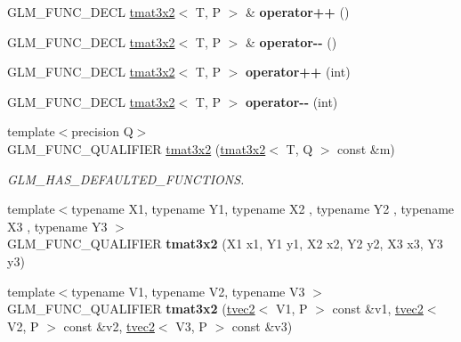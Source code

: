 \begin{DoxyCompactItemize}
G\+L\+M\+\_\+\+F\+U\+N\+C\+\_\+\+D\+E\+CL \hyperlink{structglm_1_1tmat3x2}{tmat3x2}$<$ T, P $>$ \& {\bfseries operator++} ()
\item 
\mbox{\label{structglm_1_1tmat3x2_a655f4f20c013de86c872da9a60183b05}} 
G\+L\+M\+\_\+\+F\+U\+N\+C\+\_\+\+D\+E\+CL \hyperlink{structglm_1_1tmat3x2}{tmat3x2}$<$ T, P $>$ \& {\bfseries operator-\/-\/} ()
\item 
\mbox{\label{structglm_1_1tmat3x2_a70f90e05d9c13d7145369d4e3ebf7184}} 
G\+L\+M\+\_\+\+F\+U\+N\+C\+\_\+\+D\+E\+CL \hyperlink{structglm_1_1tmat3x2}{tmat3x2}$<$ T, P $>$ {\bfseries operator++} (int)
\item 
\mbox{\label{structglm_1_1tmat3x2_a79b323eca5c708e456e2675586895444}} 
G\+L\+M\+\_\+\+F\+U\+N\+C\+\_\+\+D\+E\+CL \hyperlink{structglm_1_1tmat3x2}{tmat3x2}$<$ T, P $>$ {\bfseries operator-\/-\/} (int)
\item 
\mbox{\label{structglm_1_1tmat3x2_a5c9661d554c44cfa3db4ca95c5fd553a}} 
{\footnotesize template$<$precision Q$>$ }\\G\+L\+M\+\_\+\+F\+U\+N\+C\+\_\+\+Q\+U\+A\+L\+I\+F\+I\+ER \hyperlink{structglm_1_1tmat3x2_a5c9661d554c44cfa3db4ca95c5fd553a}{tmat3x2} (\hyperlink{structglm_1_1tmat3x2}{tmat3x2}$<$ T, Q $>$ const \&m)
\begin{DoxyCompactList}\small\item\em G\+L\+M\+\_\+\+H\+A\+S\+\_\+\+D\+E\+F\+A\+U\+L\+T\+E\+D\+\_\+\+F\+U\+N\+C\+T\+I\+O\+NS. \end{DoxyCompactList}\item 
\mbox{\label{structglm_1_1tmat3x2_a52d0621ae05376523e889c01e6ad3e08}} 
{\footnotesize template$<$typename X1, typename Y1, typename X2 , typename Y2 , typename X3 , typename Y3 $>$ }\\G\+L\+M\+\_\+\+F\+U\+N\+C\+\_\+\+Q\+U\+A\+L\+I\+F\+I\+ER {\bfseries tmat3x2} (X1 x1, Y1 y1, X2 x2, Y2 y2, X3 x3, Y3 y3)
\item 
\mbox{\label{structglm_1_1tmat3x2_a1d369b5df9f52f6561912a6d8d4d581b}} 
{\footnotesize template$<$typename V1, typename V2, typename V3 $>$ }\\G\+L\+M\+\_\+\+F\+U\+N\+C\+\_\+\+Q\+U\+A\+L\+I\+F\+I\+ER {\bfseries tmat3x2} (\hyperlink{structglm_1_1tvec2}{tvec2}$<$ V1, P $>$ const \&v1, \hyperlink{structglm_1_1tvec2}{tvec2}$<$ V2, P $>$ const \&v2, \hyperlink{structglm_1_1tvec2}{tvec2}$<$ V3, P $>$ const \&v3)

\end{DoxyCompactItemize}
